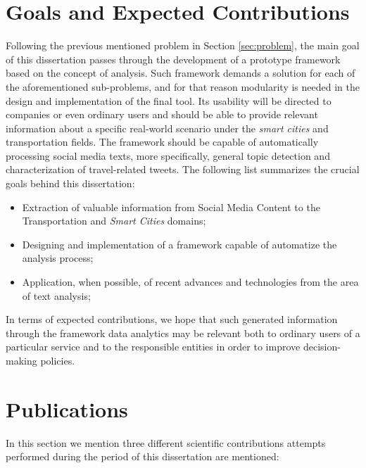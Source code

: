 \section{Goals and Expected Contributions}\label{sec:contributions}
Following the previous mentioned problem in Section \ref{sec:problem}, the main goal of this dissertation passes through the development of a prototype framework based on the concept of analysis. Such framework demands a solution for each of the aforementioned sub-problems, and for that reason modularity is needed in the design and implementation of the final tool. Its usability will be directed to companies or even ordinary users and should be able to provide relevant information about a specific real-world scenario under the \textit{smart cities} and transportation fields. The framework should be capable of automatically processing social media texts, more specifically, general topic detection and characterization of travel-related tweets. The following list summarizes the crucial goals behind this dissertation:

\begin{itemize}
	\item Extraction of valuable information from Social Media Content to the Transportation and \textit{Smart Cities} domains;
	\item Designing and implementation of a framework capable of automatize the analysis process;
	\item Application, when possible, of recent advances and technologies from the area of text analysis;
\end{itemize}

\medskip

In terms of expected contributions, we hope that such generated information through the framework data analytics may be relevant both to ordinary users of a particular service and to the responsible entities in order to improve decision-making policies.

\section{Publications}\label{sec:publications}
In this section we mention three different scientific contributions attempts performed during the period of this dissertation are mentioned:

